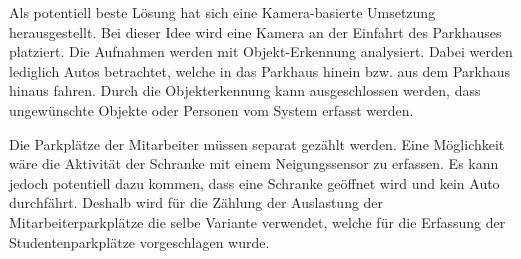Als potentiell beste Lösung hat sich eine Kamera-basierte Umsetzung herausgestellt.
Bei dieser Idee wird eine Kamera an der Einfahrt des Parkhauses platziert.
Die Aufnahmen werden mit Objekt-Erkennung analysiert.
Dabei werden lediglich Autos betrachtet, welche in das Parkhaus hinein bzw. aus dem Parkhaus hinaus fahren.
Durch die Objekterkennung kann ausgeschlossen werden, dass ungewünschte Objekte oder Personen vom System erfasst werden.

Die Parkplätze der Mitarbeiter müssen separat gezählt werden.
Eine Möglichkeit wäre die Aktivität der Schranke mit einem Neigungssensor zu erfassen.
Es kann jedoch potentiell dazu kommen, dass eine Schranke geöffnet wird und kein Auto durchfährt.
Deshalb wird für die Zählung der Auslastung der Mitarbeiterparkplätze die selbe Variante verwendet, welche für die Erfassung der Studentenparkplätze vorgeschlagen wurde.
